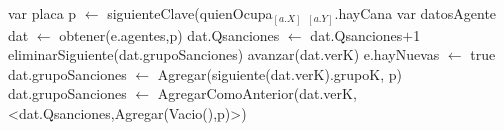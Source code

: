 \begin{algorithmic}
\begin{algorithm}
 
	\State var placa p $\gets$ siguienteClave(quienOcupa$_{[a.X]}$ $_{[a.Y]}$.hayCana 
	\State var datosAgente dat $\gets$ obtener(e.agentes,p) 
	\State dat.Qsanciones $\gets$ dat.Qsanciones$+$1 
	\State eliminarSiguiente(dat.grupoSanciones)  
	\State avanzar(dat.verK)  
	\State e.hayNuevas $\gets$ true  
	 
		\State dat.grupoSanciones $\gets$ Agregar(siguiente(dat.verK).grupoK, p)  
	\Else
		\State dat.grupoSanciones $\gets$ AgregarComoAnterior(dat.verK, <dat.Qsanciones,Agregar(Vacio(),p)>) 
	\EndIf
\EndFunction
\end{algorithm}
\end{algorithmic}
